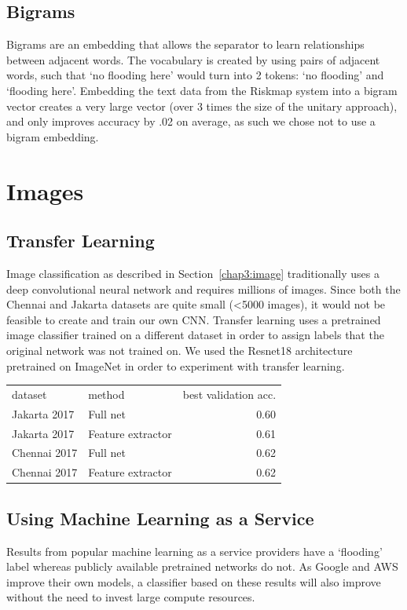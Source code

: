 \subsection{Bigrams}
Bigrams are an embedding that allows the separator to learn relationships
between adjacent words. The vocabulary is created by using pairs of adjacent
words, such that `no flooding here' would turn into 2 tokens: `no flooding' and
`flooding here'. Embedding the text data from the Riskmap system into a bigram
vector creates a very large vector (over 3 times the size of the unitary approach),
and only improves accuracy by .02 on average, as such we chose not to use a
bigram embedding.


\section{Images}
\subsection{Transfer Learning}
Image classification as described in Section~\ref{chap3:image} traditionally uses a
deep convolutional neural network and requires millions of images. Since both the
Chennai and Jakarta datasets are quite small (<5000 images), it would not be
feasible to create and train our own CNN. Transfer learning uses a pretrained
image classifier trained on a different dataset in order to assign labels that the
original network was not trained on.
We used the Resnet18 architecture pretrained on ImageNet in order to
experiment with transfer learning.

\begin{tabular}{llr}\label{table:transfer_learning}
\toprule
      dataset &             method &  best validation acc. \\
 Jakarta 2017 &           Full net &                  0.60 \\
\midrule
 Jakarta 2017 &  Feature extractor &                  0.61 \\
 Chennai 2017 &           Full net &                  0.62 \\
 Chennai 2017 &  Feature extractor &                  0.62 \\
\bottomrule
\end{tabular}

\subsection{Using Machine Learning as a Service}
Results from popular machine learning as a service providers have a `flooding'
label whereas publicly available pretrained networks do not.
As Google and AWS improve their own models, a classifier based on these results
will also improve without the need to invest large compute resources.


